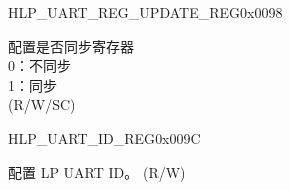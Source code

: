 \begin{register}{H}{LP\_UART\_REG\_UPDATE\_REG}{0x0098}\label{regdesc:LPUARTREGUPDATEREG}
%
%
\regnewline%
\begin{regdesc}\begin{reglist}
\label{fielddesc:LPUARTREGUPDATE}\item [LP\_UART\_REG\_UPDATE] 配置是否同步寄存器\\
0：不同步\\
1：同步\\(R/W/SC)
\end{reglist}\end{regdesc}
\end{register}


\begin{register}{H}{LP\_UART\_ID\_REG}{0x009C}\label{regdesc:LPUARTIDREG}
%
\regnewline%
\begin{regdesc}\begin{reglist}
\label{fielddesc:LPUARTID}\item [LP\_UART\_ID] 配置 LP UART ID。 (R/W)
\end{reglist}\end{regdesc}
\end{register}
